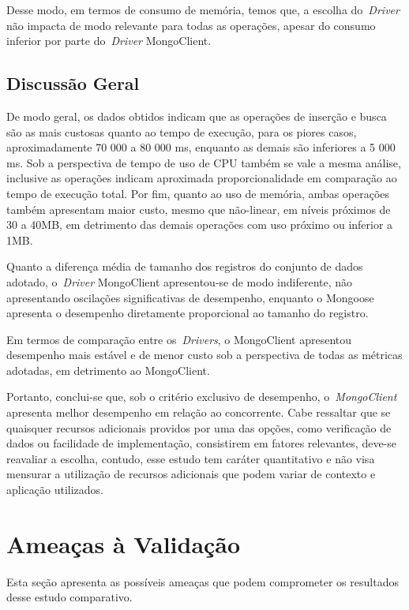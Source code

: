 \documentclass[12pt]{article}
\begin{document}
Desse modo, em termos de consumo de memória, temos que, a escolha do~\emph{Driver} não impacta de modo relevante para todas as operações, apesar do consumo inferior por parte do~\emph{Driver} MongoClient.

\subsection{Discussão Geral}
\label{qgeral}

De modo geral, os dados obtidos indicam que as operações de inserção e busca são as mais custosas quanto ao tempo de execução, para os piores casos, aproximadamente 70 000 a 80 000 ms, enquanto as demais são inferiores a 5 000 ms.
Sob a perspectiva de tempo de uso de CPU também se vale a mesma análise, inclusive as operações indicam aproximada proporcionalidade em comparação ao tempo de execução total.
Por fim, quanto ao uso de memória, ambas operações também apresentam maior custo, mesmo que não-linear, em níveis próximos de 30 a 40MB, em detrimento das demais operações com uso próximo ou inferior a 1MB.

Quanto a diferença média de tamanho dos registros do conjunto de dados adotado, o~\emph{Driver} MongoClient apresentou-se de modo indiferente, não apresentando oscilações significativas de desempenho, enquanto o Mongoose apresenta o desempenho diretamente proporcional ao tamanho do registro.

Em termos de comparação entre os~\emph{Drivers}, o MongoClient apresentou desempenho mais estável e de menor custo sob a perspectiva de todas as métricas adotadas, em detrimento ao MongoClient.

Portanto, conclui-se que, sob o critério exclusivo de desempenho, o~\emph{MongoClient} apresenta melhor desempenho em relação ao concorrente.
Cabe ressaltar que se quaisquer recursos adicionais providos por uma das opções, como verificação de dados ou facilidade de implementação, consistirem em fatores relevantes, deve-se reavaliar a escolha, contudo, esse estudo tem caráter quantitativo e não visa mensurar a utilização de recursos adicionais que podem variar de contexto e aplicação utilizados.

\section{Ameaças à Validação}
\label{section:limitacoes}

Esta seção apresenta as possíveis ameaças que podem comprometer os resultados desse estudo comparativo.
\end{document}
